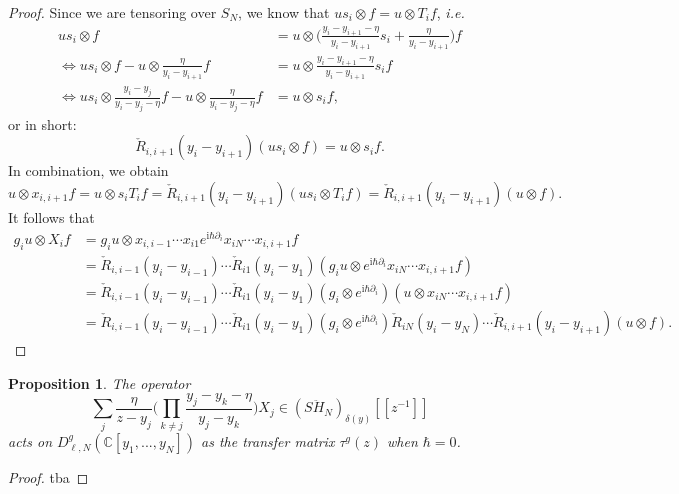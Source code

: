 \documentclass[11pt]{report}
\newtheorem{prop}[theorem]{Proposition}
\theoremstyle{definition}
\theoremstyle{remark}
\theoremstyle{remark}
\newcommand{\C}{\mathbb{C}}
\newcommand{\I}{\mathrm{i}}
\begin{document}
\begin{proof}
Since we are tensoring over $S_N$, we know that $u s_i \otimes f = u \otimes T_i f$, \emph{i.e.}
\begin{align*}
us_i  \otimes f &= u \otimes \bigg( \frac{y_i-y_{i+1}-\eta}{y_i-y_{i+1}} s_i + \frac{\eta}{y_i-y_{i+1}} \bigg) f \\
\Leftrightarrow u s_i \otimes f - u \otimes \frac{\eta}{y_i-y_{i+1}} f &= u \otimes \frac{y_i-y_{i+1}-\eta}{y_i-y_{i+1}} s_i f \\
\Leftrightarrow u s_i \otimes \frac{y_i-y_j}{y_i-y_j-\eta} f - u \otimes \frac{\eta}{y_i-y_j-\eta} f &= u \otimes s_i f,
\end{align*}
or in short:
\begin{equation*}
\check R_{i,i+1}(y_i-y_{i+1}) (u s_i \otimes f) = u \otimes s_i f.
\end{equation*}
In combination, we obtain
\begin{equation*}
u \otimes x_{i,i+1} f = u \otimes s_i T_i f = \check R_{i,i+1}(y_i-y_{i+1}) (u s_i \otimes T_i f) = \check R_{i,i+1}(y_i-y_{i+1})(u \otimes f).
\end{equation*}
It follows that
\begin{align*}
g_i u \otimes X_i f
&= g_i u \otimes x_{i,i-1} \cdots x_{i1} e^{\I \hbar \partial_i} x_{iN} \cdots x_{i,i+1} f \\
&= \check R_{i,i-1}(y_i-y_{i-1}) \cdots \check R_{i1}(y_i-y_1) (g_i u \otimes e^{\I \hbar \partial_i} x_{iN} \cdots x_{i,i+1} f) \\
&= \check R_{i,i-1}(y_i-y_{i-1}) \cdots \check R_{i1}(y_i-y_1) (g_i \otimes e^{\I \hbar \partial_i}) (u \otimes x_{iN} \cdots x_{i,i+1} f) \\
&= \check R_{i,i-1}(y_i-y_{i-1}) \cdots \check R_{i1}(y_i-y_1) (g_i \otimes e^{\I \hbar \partial_i}) \check R_{iN}(y_i-y_N) \cdots \check R_{i,i+1}(y_i-y_{i+1}) (u \otimes f).
\end{align*}
\end{proof}

\begin{prop}
The operator
\begin{equation*}
\sum_j \frac{\eta}{z-y_j} \bigg( \prod_{k \neq j} \frac{y_j-y_k-\eta}{y_j-y_k} \bigg) X_j \in (S\ddot H_N)_{\delta(y)}[[z^{-1}]]
\end{equation*}
acts on $D_{\ell,N}^g(\C[y_1,...,y_N])$ as the transfer matrix $\tau^g(z)$ when $\hbar = 0$.
\end{prop}

\begin{proof}
tba
\end{proof}
\end{document}
